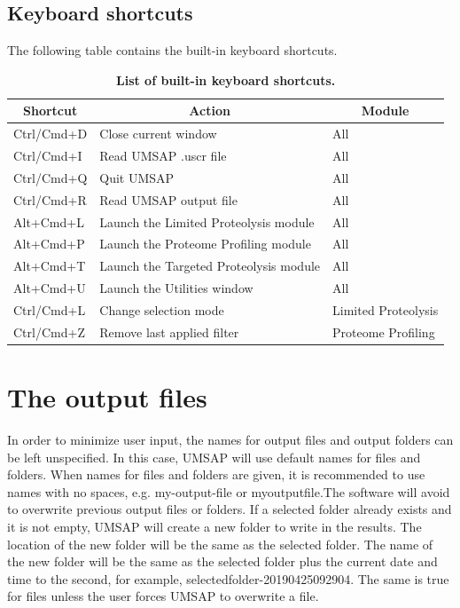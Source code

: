 \subsection{Keyboard shortcuts}

The following table contains the built-in keyboard shortcuts.

\begin{table}[h!]
	\centering
	\begin{tabular}{l l l}
		\hline
		\multicolumn{1}{c}{Shortcut} & \multicolumn{1}{c}{Action} & \multicolumn{1}{c}{Module} \\
		\hline
		Ctrl/Cmd+D & Close current window & All \\		
		Ctrl/Cmd+I  & Read UMSAP .uscr file & All \\		
		Ctrl/Cmd+Q & Quit UMSAP                & All \\
		Ctrl/Cmd+R & Read UMSAP output file  & All \\		
		Alt+Cmd+L & Launch the Limited Proteolysis module & All \\
		Alt+Cmd+P & Launch the Proteome Profiling module  & All \\
		Alt+Cmd+T & Launch the Targeted Proteolysis module & All \\
		Alt+Cmd+U & Launch the Utilities window & All \\		
		Ctrl/Cmd+L & Change selection mode & Limited Proteolysis \\								
		Ctrl/Cmd+Z & Remove last applied filter & Proteome Profiling \\
		\hline		
	\end{tabular}
	\caption[List of built-in keyboard shortcuts]{\textbf{List of built-in keyboard shortcuts.}}
	\label{table:shortcuts}
\end{table}

\section{The output files}

In order to minimize user input, the names for output files and output folders can be left unspecified. In this case, UMSAP will use default names for files and folders. When names for files and folders are given, it is recommended to use names with no spaces, e.g. my-output-file or myoutputfile.The software will avoid to overwrite previous output files or folders. If a selected folder already exists and it is not empty, UMSAP will create a new folder to write in the results. The location of the new folder will be the same as the selected folder. The name of the new folder will be the same as the selected folder plus the current date and time to the second, for example, selectedfolder-20190425092904. The same is true for files unless the user forces UMSAP to overwrite a file. 


